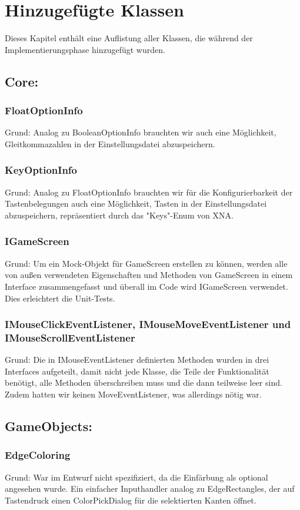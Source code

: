 \chapter{Hinzugefügte Klassen}
Dieses Kapitel enthält eine Auflistung aller Klassen, die während der Implementierungsphase hinzugefügt wurden.

\section{Core:}
\subsection{FloatOptionInfo}
Grund: Analog zu BooleanOptionInfo brauchten wir auch eine Möglichkeit, Gleitkommazahlen in der Einstellungsdatei abzuspeichern.
\subsection{KeyOptionInfo}
Grund: Analog zu FloatOptionInfo brauchten wir für die Konfigurierbarkeit der Tastenbelegungen auch eine Möglichkeit, Tasten in der Einstellungsdatei abzuspeichern, repräsentiert durch das "Keys"-Enum von XNA.
\subsection{IGameScreen}
Grund: Um ein Mock-Objekt für GameScreen erstellen zu können, werden alle von außen verwendeten Eigenschaften und Methoden von GameScreen in einem Interface zusammengefasst und überall im Code wird IGameScreen verwendet. Dies erleichtert die Unit-Tests.
\subsection{IMouseClickEventListener, IMouseMoveEventListener und IMouseScrollEventListener}
Grund: Die in IMouseEventListener definierten Methoden wurden in drei Interfaces aufgeteilt, damit nicht jede Klasse,
die Teile der Funktionalität benötigt, alle Methoden überschreiben muss und die dann teilweise leer sind. Zudem hatten wir keinen MoveEventListener, was allerdings nötig war.

\section{GameObjects:}
\subsection{EdgeColoring}
Grund: War im Entwurf nicht spezifiziert, da die Einfärbung als optional angesehen wurde. Ein einfacher Inputhandler analog zu EdgeRectangles, der auf Tastendruck einen ColorPickDialog für die selektierten Kanten öffnet.
